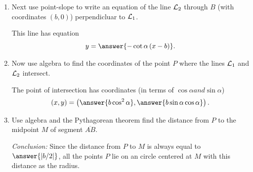 \documentclass{ximera}
\begin{document}
\begin{question}
\begin{enumerate}
\item Next use point-slope to write an equation of the line ${\cal L}_2$ through $B$ (with coordinates $(b,0)$)  perpendicluar to ${\cal L}_1$.

This line has equation
\[
   y = \answer{-\cot \alpha \left( x - b \right)}.
\]

\item Now use algebra to find the coordinates of the point $P$ where the lines ${\cal L}_1$ and ${\cal L}_2$ intersect.

The point of intersection has coordinates (in terms of $\cos\alpha and \sin\alpha$)
\[
    (x,y) = \left(  \answer{b \cos^2\alpha}  , \answer{b \sin\alpha \cos\alpha}   \right) .
\]

\item Use algebra and the Pythagorean theorem find the distance from $P$ to the midpoint $M$ of segment $\overline{AB}$.

\emph{Conclusion:} Since the distance from $P$ to $M$ is always equal to $\answer{|b/2|}$, all the points $P$ lie on an circle centered at $M$ with this distance as the radius. 

\end{enumerate}


\end{question}
\end{document}
